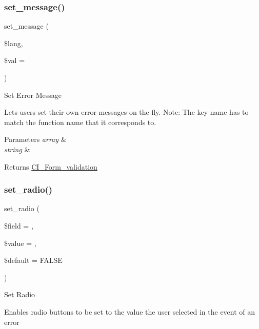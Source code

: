 \subsubsection{\texorpdfstring{set\+\_\+message()}{set\_message()}}
{\footnotesize\ttfamily set\+\_\+message (\begin{DoxyParamCaption}\item[{}]{\$lang,  }\item[{}]{\$val = {\ttfamily \textquotesingle{}\textquotesingle{}} }\end{DoxyParamCaption})}

Set Error Message

Lets users set their own error messages on the fly. Note\+: The key name has to match the function name that it corresponds to.


\begin{DoxyParams}{Parameters}
{\em array} & \\
\hline
{\em string} & \\
\hline
\end{DoxyParams}
\begin{DoxyReturn}{Returns}
\mbox{\hyperlink{class_c_i___form__validation}{C\+I\+\_\+\+Form\+\_\+validation}} 
\end{DoxyReturn}
\mbox{\label{class_c_i___form__validation_a9e66e3cdc5ceb81c054d48e1203613f2}} 
\subsubsection{\texorpdfstring{set\+\_\+radio()}{set\_radio()}}
{\footnotesize\ttfamily set\+\_\+radio (\begin{DoxyParamCaption}\item[{}]{\$field = {\ttfamily \textquotesingle{}\textquotesingle{}},  }\item[{}]{\$value = {\ttfamily \textquotesingle{}\textquotesingle{}},  }\item[{}]{\$default = {\ttfamily FALSE} }\end{DoxyParamCaption})}

Set Radio

Enables radio buttons to be set to the value the user selected in the event of an error


